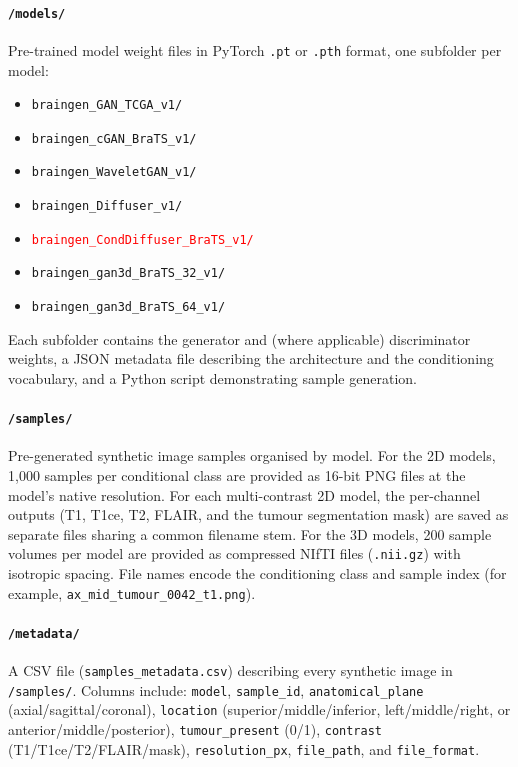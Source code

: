 \documentclass[11pt]{article}
\begin{document}
\paragraph{\texttt{/models/}} Pre-trained model weight files in PyTorch \texttt{.pt} or \texttt{.pth} format, one subfolder per model:
\begin{itemize}
  \item \texttt{braingen\_GAN\_TCGA\_v1/}
  \item \texttt{braingen\_cGAN\_BraTS\_v1/}
  \item \texttt{braingen\_WaveletGAN\_v1/}
  \item \texttt{braingen\_Diffuser\_v1/}
  \item \textcolor{red}{\texttt{braingen\_CondDiffuser\_BraTS\_v1/}}
  \item \texttt{braingen\_gan3d\_BraTS\_32\_v1/}
  \item \texttt{braingen\_gan3d\_BraTS\_64\_v1/}
\end{itemize}
Each subfolder contains the generator and (where applicable) discriminator weights, a JSON metadata file describing the architecture and the conditioning vocabulary, and a Python script demonstrating sample generation.\\
\paragraph{\texttt{/samples/}} Pre-generated synthetic image samples organised by model. For the 2D models, 1{,}000 samples per conditional class are provided as 16-bit PNG files at the model's native resolution. For each multi-contrast 2D model, the per-channel outputs (T1, T1ce, T2, FLAIR, and the tumour segmentation mask) are saved as separate files sharing a common filename stem. For the 3D models, 200 sample volumes per model are provided as compressed NIfTI files (\texttt{.nii.gz}) with isotropic spacing. File names encode the conditioning class and sample index (for example, \texttt{ax\_mid\_tumour\_0042\_t1.png}).\\
\paragraph{\texttt{/metadata/}} A CSV file (\texttt{samples\_metadata.csv}) describing every synthetic image in \texttt{/samples/}. Columns include: \texttt{model}, \texttt{sample\_id}, \texttt{anatomical\_plane} (axial/sagittal/coronal), \texttt{location} (superior/middle/inferior, left/middle/right, or anterior/middle/posterior), \texttt{tumour\_present} (0/1), \texttt{contrast} (T1/T1ce/T2/FLAIR/mask), \texttt{resolution\_px}, \texttt{file\_path}, and \texttt{file\_format}.\\
\end{document}
